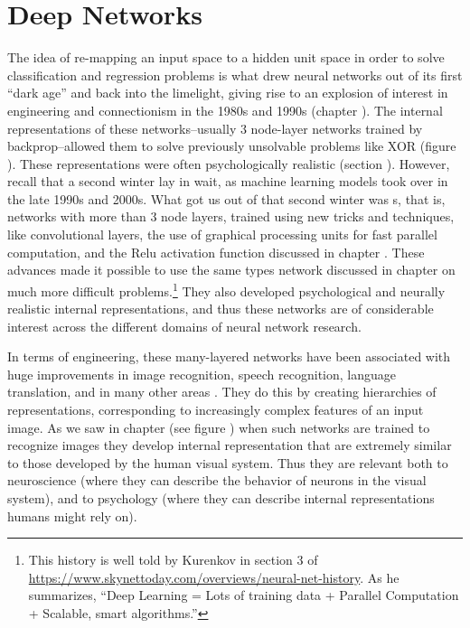\chapter{Deep Networks}\label{ch_deep_nets}


The idea of re-mapping an input space to a hidden unit space in order to solve classification and regression problems is what drew neural networks out of its first ``dark age'' and back into the limelight, giving rise to an explosion of interest in engineering and connectionism in the 1980s and 1990s (chapter ). The internal representations of these networks--usually 3 node-layer networks trained by backprop--allowed them to solve previously unsolvable problems like XOR (figure ). These representations were often psychologically realistic (section ). However, recall that a second  winter lay in wait, as machine learning models took over in the late 1990s and 2000s. What got us out of that second winter was s, that is, networks with more than 3 node layers, trained using new tricks and techniques, like convolutional layers, the use of graphical processing units for fast parallel computation, and the Relu activation function discussed in chapter . These advances made it possible to use the same types network discussed in chapter  on much more difficult problems.\footnote{This history is well told by Kurenkov in section 3 of \url{https://www.skynettoday.com/overviews/neural-net-history}. As he summarizes, ``Deep Learning = Lots of training data + Parallel Computation + Scalable, smart algorithms.''}  They also developed psychological and neurally realistic internal representations, and thus these networks are of considerable interest across the different domains of neural network research.

In terms of engineering, these many-layered networks have been associated with huge improvements in image recognition, speech recognition, language translation, and in many other areas \cite{lecun2015deep, goodfellow2016deep}. They do this by creating hierarchies of representations, corresponding  to increasingly complex features of an input image. As we saw in chapter  (see figure ) when such networks are trained to recognize images they develop internal representation that are extremely similar to those developed by the human visual  system. Thus they are relevant both to neuroscience (where they can describe the behavior of neurons in the visual system), and to psychology (where they can describe internal representations humans might rely on).

